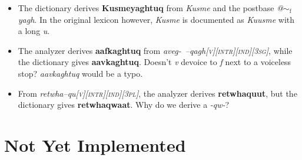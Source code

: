 \documentclass{article}
\begin{document}
\begin{itemize}
\item The dictionary derives \textbf{Kusmeyaghtuq} from \textit{Kusme} and the postbase \textit{@$\sim_\text{f}$yagh}. In the original lexicon however, \textit{Kusme} is documented as \textit{Kuusme} with a long \textit{u}.

\item The analyzer derives \textbf{aafkaghtuq} from \textit{aveg-~–qagh\textsc{[v][intr][ind][3sg]}}, while the dictionary gives \textbf{aavkaghtuq}. Doesn't \textit{v} devoice to \textit{f} next to a voiceless stop? \textit{aavkaghtuq} would be a typo.

\item From \textit{retwha--qu\textsc{[v][intr][ind][3pl]}}, the analyzer derives \textbf{retwhaquut}, but the dictionary gives \textbf{retwhaqwaat}. Why do we derive a \textit{-qw-}?
\end{itemize}

\pagebreak

\section{Not Yet Implemented}

\end{document}
